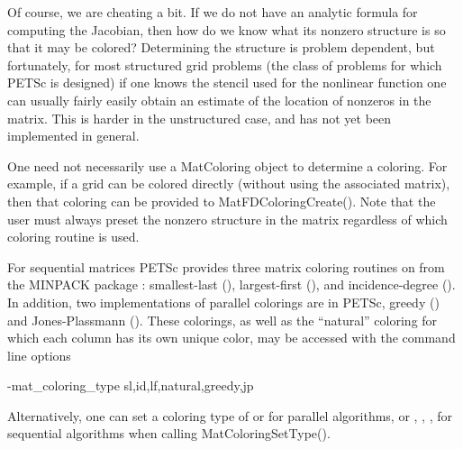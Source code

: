 Of course, we are cheating a bit. If we do not have an analytic
formula for computing the Jacobian, then how do we know what its
nonzero structure is so that it may be colored?  Determining the
structure is problem dependent, but fortunately, for most structured grid
problems (the class of problems for which PETSc is designed) if one
knows the stencil used for the nonlinear function one can usually
fairly easily obtain an estimate of the location of nonzeros in
the matrix. This is harder in the unstructured case, and has not yet
been implemented in general.

One need not necessarily use a MatColoring object to
determine a coloring.  For example, if a grid can be colored directly
(without using the associated matrix), then that coloring can be provided
to MatFDColoringCreate().  Note that the user must always
preset the nonzero structure in the matrix regardless of which
coloring routine is used.

For sequential matrices PETSc provides three matrix coloring routines on from the MINPACK package \cite{more84}:
smallest-last (), largest-first (), and incidence-degree ().  In addition, two implementations
of parallel colorings are in PETSc, greedy () and Jones-Plassmann (). These colorings, as well as the
``natural'' coloring for which each column has its own unique color, may be accessed with the command line options
\begin{tabbing}
   -mat\_coloring\_type \trl{<}sl,id,lf,natural,greedy,jp\trl{> }
\end{tabbing}
Alternatively, one can set a coloring type of  or  for parallel algorithms,
or , , ,  for sequential algorithms
when calling MatColoringSetType().   
   

